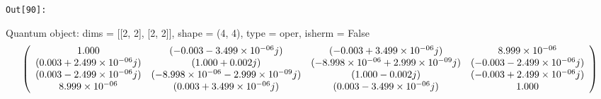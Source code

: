 \documentclass[11pt]{article}
\begin{document}
\texttt{\color{outcolor}Out[{\color{outcolor}90}]:}
    
    Quantum object: dims = [[2, 2], [2, 2]], shape = (4, 4), type = oper, isherm = False\begin{equation*}\left(\begin{array}{*{11}c}1.000 & (-0.003-3.499\times10^{-06}j) & (-0.003+3.499\times10^{-06}j) & 8.999\times10^{-06}\\(0.003+2.499\times10^{-06}j) & (1.000+0.002j) & (-8.998\times10^{-06}+2.999\times10^{-09}j) & (-0.003-2.499\times10^{-06}j)\\(0.003-2.499\times10^{-06}j) & (-8.998\times10^{-06}-2.999\times10^{-09}j) & (1.000-0.002j) & (-0.003+2.499\times10^{-06}j)\\8.999\times10^{-06} & (0.003+3.499\times10^{-06}j) & (0.003-3.499\times10^{-06}j) & 1.000\\\end{array}\right)\end{equation*}

    
\end{document}
